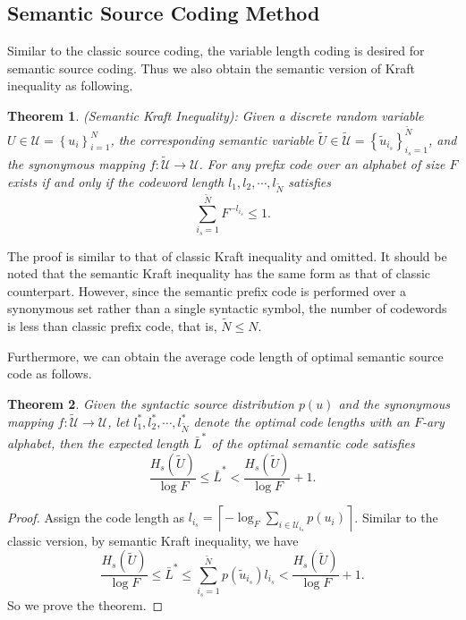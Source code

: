 \documentclass[12pt, draftclsnofoot,onecolumn]{IEEEtran}
\newtheorem{theorem}{\bf{Theorem}}
\begin{document}
\subsection{Semantic Source Coding Method}
Similar to the classic source coding, the variable length coding is desired for semantic source coding. Thus we also obtain the semantic version of Kraft inequality as following.
\begin{theorem}
(Semantic Kraft Inequality):
Given a discrete random variable $U\in \mathcal{U}=\left\{u_i\right\}_{i=1}^{N}$, the corresponding semantic variable $\tilde {U}\in \tilde{\mathcal{U}}=\left\{\tilde{u}_{i_s}\right\}_{i_s=1}^{\tilde{N}}$, and the synonymous mapping $f: \tilde{\mathcal{U}}\to\mathcal{U}$. For any prefix code over an alphabet of size $F$ exists if and only if the codeword length $l_1,l_2,\cdots, l_{\tilde{N}}$ satisfies
\begin{equation}
\sum_{i_s=1}^{\tilde{N}}F^{-l_{i_s}}\leq 1.
\end{equation}
\end{theorem}

The proof is similar to that of classic Kraft inequality and omitted. It should be noted that the semantic Kraft inequality has the same form as that of classic counterpart. However, since the semantic prefix code is performed over a synonymous set rather than a single syntactic symbol, the number of codewords is less than classic prefix code, that is, $\tilde{N}\leq N$.

Furthermore, we can obtain the average code length of optimal semantic source code as follows.
\begin{theorem}
Given the syntactic source distribution $p(u)$ and the synonymous mapping $f: \tilde{\mathcal{U}}\to\mathcal{U}$, let $l_1^*,l_2^*,\cdots, l_{\tilde{N}}^*$ denote the optimal code lengths with an $F$-ary alphabet, then the expected length $\bar{L}^*$ of the optimal semantic code satisfies
\begin{equation}
\frac{H_s(\tilde{U})}{\log F}\leq \bar{L}^* < \frac{H_s(\tilde{U})}{\log F}+1.
\end{equation}
\end{theorem}
\begin{proof}
Assign the code length as $l_{i_s}=\left\lceil-\log_F \sum_{i\in \mathcal{U}_{i_s}} p(u_i)\right\rceil$. Similar to the classic version, by semantic Kraft inequality, we have
\begin{equation}
\frac{H_s(\tilde{U})}{\log F} \leq \bar{L}^*\leq \sum_{i_s=1}^{\tilde{N}} p(\tilde{u}_{i_s}) l_{i_s}< \frac{H_s(\tilde{U})}{\log F}+1.
\end{equation}
So we prove the theorem.
\end{proof}
\end{document}
